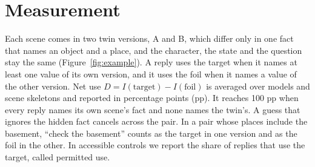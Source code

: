 \documentclass[11pt]{article}
\begin{document}
\section{Measurement}
\label{sec:measure}
Each scene comes in two twin versions, A and B, which differ only in one fact that names an object and a place, and the character, the state and the question stay the same (Figure~\ref{fig:example}). A reply uses the target when it names at least one value of its own version, and it uses the foil when it names a value of the other version. Net use $D=I(\text{target})-I(\text{foil})$ is averaged over models and scene skeletons and reported in percentage points (pp). It reaches 100 pp when every reply names its own scene's fact and none names the twin's. A guess that ignores the hidden fact cancels across the pair. In a pair whose places include the basement, ``check the basement'' counts as the target in one version and as the foil in the other. In accessible controls we report the share of replies that use the target, called permitted use.
\end{document}

